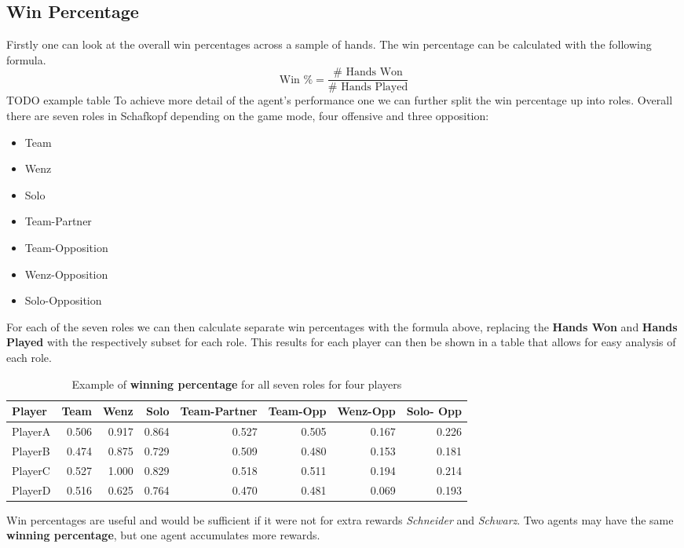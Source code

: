 \subsection{Win Percentage}
Firstly one can look at the overall win percentages across a sample of hands.
The win percentage can be calculated with the following formula.
\[\text{Win \%} = \frac{\# \text{ Hands Won}}{\# \text{ Hands Played}}\]
TODO example table
To achieve more detail of the agent's performance one we can further split the win percentage up into roles.
Overall there are seven roles in Schafkopf depending on the game mode, four offensive and three opposition:
\begin{itemize}
    \item Team
    \item Wenz
    \item Solo
    \item Team-Partner
    \item Team-Opposition
    \item Wenz-Opposition
    \item Solo-Opposition
\end{itemize}
For each of the seven roles we can then calculate separate win percentages with the formula above, replacing the
\textbf{Hands Won} and \textbf{Hands Played} with the respectively subset for each role.
\newline
This results for each player can then be shown in a table that allows for easy analysis of each role.
\newline
\begin{table}
\begin{tabular}{lrrrrrrr}
    \toprule
    Player & Team & Wenz & Solo & Team-Partner & Team-Opp & Wenz-Opp & Solo-
    Opp \\
    \midrule
    PlayerA & 0.506 & 0.917 & 0.864 & 0.527 & 0.505 & 0.167 & 0.226 \\
    PlayerB & 0.474 & 0.875 & 0.729 & 0.509 & 0.480 & 0.153 & 0.181 \\
    PlayerC & 0.527 & 1.000 & 0.829 & 0.518 & 0.511 & 0.194 & 0.214 \\
    PlayerD & 0.516 & 0.625 & 0.764 & 0.470 & 0.481 & 0.069 & 0.193 \\
    \bottomrule
\end{tabular}
\caption{Example of \textbf{winning percentage} for all seven roles for four players}
\label{winpercentageroles}
\end{table}
\newline
Win percentages are useful and would be sufficient if it were not for extra rewards \textit{Schneider} and
\textit{Schwarz}.
Two agents may have the same \textbf{winning percentage}, but one agent accumulates more rewards.

